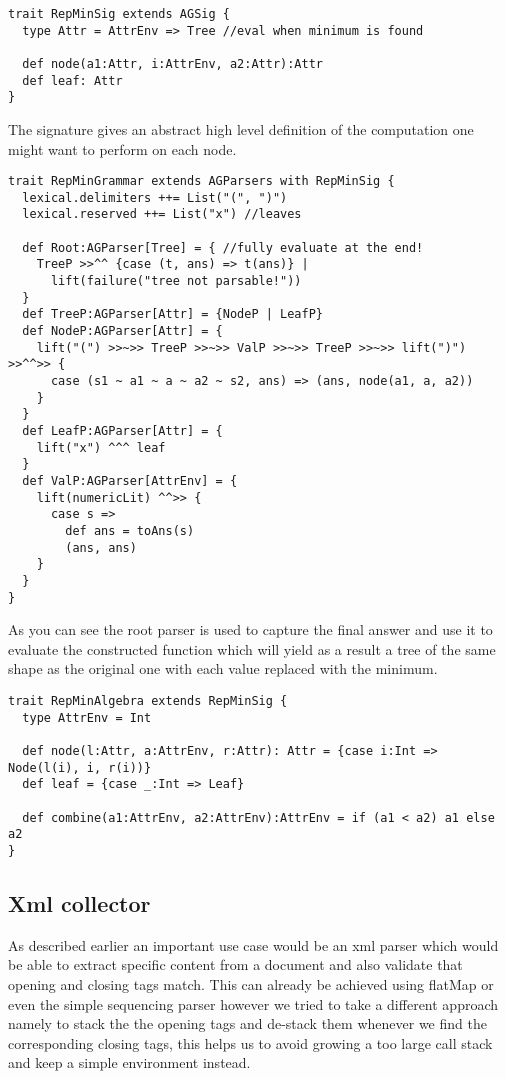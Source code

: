 \begin{lstlisting}
trait RepMinSig extends AGSig {
  type Attr = AttrEnv => Tree //eval when minimum is found
  
  def node(a1:Attr, i:AttrEnv, a2:Attr):Attr
  def leaf: Attr
}
\end{lstlisting}

The signature gives an abstract high level definition of the computation one might want to perform on each node.

\begin{lstlisting}
trait RepMinGrammar extends AGParsers with RepMinSig {
  lexical.delimiters ++= List("(", ")")
  lexical.reserved ++= List("x") //leaves

  def Root:AGParser[Tree] = { //fully evaluate at the end!
    TreeP >>^^ {case (t, ans) => t(ans)} |
      lift(failure("tree not parsable!"))
  }
  def TreeP:AGParser[Attr] = {NodeP | LeafP}
  def NodeP:AGParser[Attr] = {
    lift("(") >>~>> TreeP >>~>> ValP >>~>> TreeP >>~>> lift(")") >>^^>> {
      case (s1 ~ a1 ~ a ~ a2 ~ s2, ans) => (ans, node(a1, a, a2))
    }
  }
  def LeafP:AGParser[Attr] = {
    lift("x") ^^^ leaf
  }
  def ValP:AGParser[AttrEnv] = {
    lift(numericLit) ^^>> {
      case s =>
        def ans = toAns(s)
        (ans, ans)
    }
  }
}
\end{lstlisting}
As you can see the root parser is used to capture the final answer and use it to evaluate the constructed function which will yield as a result a tree of the same shape as the original one with each value replaced with the minimum.

\begin{lstlisting}
trait RepMinAlgebra extends RepMinSig {
  type AttrEnv = Int

  def node(l:Attr, a:AttrEnv, r:Attr): Attr = {case i:Int => Node(l(i), i, r(i))}
  def leaf = {case _:Int => Leaf}

  def combine(a1:AttrEnv, a2:AttrEnv):AttrEnv = if (a1 < a2) a1 else a2
}
\end{lstlisting}

\subsection{Xml collector}
As described earlier an important use case would be an xml parser which would be able to extract specific content from a document and also validate that opening and closing tags match. This can already be achieved using flatMap or even the simple sequencing parser however we tried to take a different approach namely to stack the the opening tags and de-stack them whenever we find the corresponding closing tags, this helps us to avoid growing a too large call stack and keep a simple environment instead.

